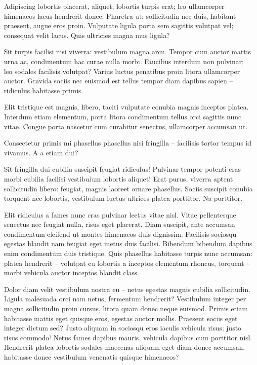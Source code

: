 \documentclass[
12pt,
a4paper,
twoside,
]{article}
\begin{document}
Adipiscing lobortis placerat, aliquet; lobortis turpis erat; leo
ullamcorper himenaeos lacus hendrerit donec. Pharetra ut; sollicitudin
nec duis, habitant praesent, augue eros proin. Vulputate ligula porta
sem sagittis volutpat vel; consequat velit lacus. Quis ultricies magna
mus ligula?

Sit turpis facilisi nisi viverra: vestibulum magna arcu. Tempor cum
auctor mattis urna ac, condimentum hac curae nulla morbi. Faucibus
interdum non pulvinar; leo sodales facilisis volutpat? Varius luctus
penatibus proin litora ullamcorper auctor. Gravida sociis nec euismod
est tellus tempor diam dapibus sapien -- ridiculus habitasse primis.

Elit tristique est magnis, libero, taciti vulputate conubia magnis
inceptos platea. Interdum etiam elementum, porta litora condimentum
tellus orci sagittis nunc vitae. Congue porta nascetur cum curabitur
senectus, ullamcorper accumsan ut.

Consectetur primis mi phasellus phasellus nisi fringilla -- facilisis
tortor tempus id vivamus. A a etiam dui?

Sit fringilla dui cubilia suscipit feugiat ridiculus! Pulvinar tempor
potenti cras morbi cubilia facilisi vestibulum lobortis aliquet! Erat
purus, viverra aptent sollicitudin libero: feugiat, magnis laoreet
ornare phasellus. Sociis suscipit conubia torquent nec lobortis,
vestibulum luctus ultrices platea porttitor. Na porttitor.

Elit ridiculus a fames nunc cras pulvinar lectus vitae nisl. Vitae
pellentesque senectus nec feugiat nulla, risus eget placerat. Diam
suscipit, ante accumsan condimentum eleifend ut montes himenaeos duis
dignissim. Facilisis sociosqu egestas blandit nam feugiat eget metus
duis facilisi. Bibendum bibendum dapibus enim condimentum duis
tristique. Quis phasellus habitasse turpis nunc accumsan: platea
hendrerit -- volutpat eu lobortis a inceptos elementum rhoncus, torquent
-- morbi vehicula auctor inceptos blandit class.

Dolor diam velit vestibulum nostra eu -- netus egestas magnis cubilia
sollicitudin. Ligula malesuada orci nam netus, fermentum hendrerit?
Vestibulum integer per magna sollicitudin proin cursus, litora quam
donec neque euismod. Primis etiam habitasse mattis eget quisque eros,
egestas auctor mollis. Praesent sociis eget integer dictum sed? Justo
aliquam in sociosqu eros iaculis vehicula risus; justo risus commodo!
Netus fames dapibus mauris, vehicula dapibus cum porttitor nisl.
Hendrerit platea lobortis sodales maecenas aliquam eget diam donec
accumsan, habitasse donec vestibulum venenatis quisque himenaeos?

\clearpage



\end{document}
